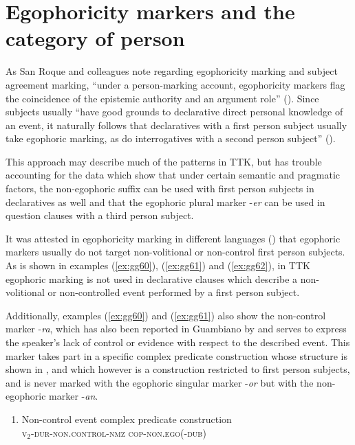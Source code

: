 \documentclass[output=paper]{langsci/langscibook}
\begin{document}
\section{Egophoricity markers and the category of person}\label{s:gg4}

As San Roque and colleagues note regarding egophoricity marking and subject agreement marking, “under a person-marking account, egophoricity markers flag the coincidence of the epistemic authority and an argument role” (\citealt[33]{SanRoque2018}). Since subjects usually “have good grounds to declarative direct personal knowledge of an event, it naturally follows that declaratives with a first person subject usually take egophoric marking, as do interrogatives with a second person subject” (\citealt[33]{SanRoque2018}).

This approach may describe much of the patterns in TTK, but has trouble accounting for the data which show that under certain semantic and pragmatic factors, the non-egophoric suffix can be used with first person subjects in declaratives as well and that the egophoric plural marker -\textit{er} can be used in question clauses with a third person subject.

It was attested in egophoricity marking in different languages (\citealt{SanRoque2018}) that egophoric markers usually do not target non-volitional or non-control first person subjects. As is shown in examples (\ref{ex:gg60}), (\ref{ex:gg61}) and (\ref{ex:gg62}), in TTK egophoric marking is not used in declarative clauses which describe a non-volitional or non-controlled event performed by a first person subject.

Additionally, examples (\ref{ex:gg60}) and (\ref{ex:gg61}) also show the non-control marker -\textit{ra}, which has also been reported in Guambiano by \citet[98--99]{Vasquez2007} and serves to express the speaker’s lack of control or evidence with respect to the described event. This marker takes part in a specific complex predicate construction whose structure is shown in , and which however is a construction restricted to first person subjects, and is never marked with the egophoric singular marker -\textit{or} but with the non-egophoric marker -\textit{an}.

\begin{enumerate}[resume]
    \item Non-control event complex predicate construction \label{fig:gg4}\\
    \textsc{v}$_2$-\textsc{dur}-\textsc{non}.\textsc{control-nmz} \textsc{cop-non.ego}(-\textsc{dub})
\end{enumerate}
\end{document}

